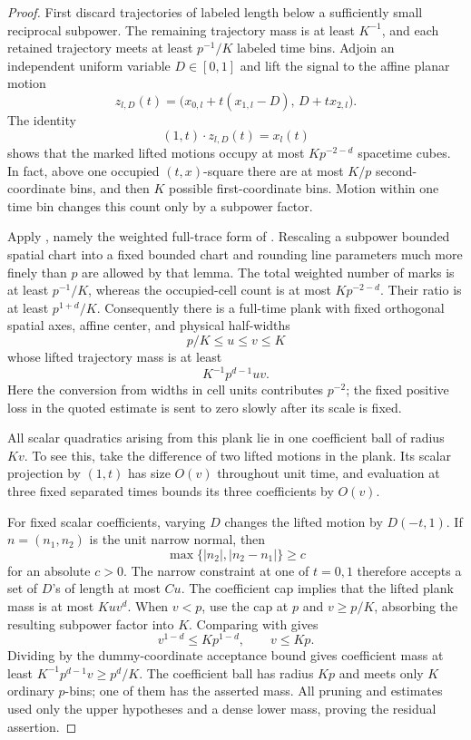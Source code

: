 \begin{proof}
First discard trajectories of labeled length below a sufficiently small
reciprocal subpower.  The remaining trajectory mass is at least \(K^{-1}\),
and each retained trajectory meets at least \(p^{-1}/K\) labeled time
bins.  Adjoin an independent uniform variable \(D\in[0,1]\) and lift the
signal to the affine planar motion
\begin{equation}\label{a04:quadratic-lift}
 z_{l,D}(t)=\bigl(x_{0,l}+t(x_{1,l}-D),\,D+t x_{2,l}\bigr).
\end{equation}
The identity
\[
 (1,t)\cdot z_{l,D}(t)=x_l(t)
\]
shows that the marked lifted motions occupy at most \(Kp^{-2-d}\)
spacetime cubes.  In fact, above one occupied \((t,x)\)-square there
are at most \(K/p\) second-coordinate bins, and then \(K\) possible
first-coordinate bins.  Motion within one time bin changes this count
only by a subpower factor.

Apply , namely the weighted full-trace form of
\citet[Lemma~2.3]{ThreeDimensional}.  Rescaling a subpower bounded spatial
chart into a fixed bounded chart and rounding line parameters much more
finely than \(p\) are allowed by that lemma.  The total weighted number
of marks is at least \(p^{-1}/K\), whereas the occupied-cell count is at
most \(Kp^{-2-d}\).  Their ratio is at least \(p^{1+d}/K\).
Consequently there is a full-time plank with fixed orthogonal spatial
axes, affine center, and physical half-widths
\[
 p/K\le u\le v\le K
\]
whose lifted trajectory mass is at least
\begin{equation}\label{a04:plank-lower}
 K^{-1}p^{d-1}uv.
\end{equation}
Here the conversion from widths in cell units contributes \(p^{-2}\);
the fixed positive loss in the quoted estimate is sent to zero slowly
after its scale is fixed.

All scalar quadratics arising from this plank lie in one coefficient
ball of radius \(Kv\).  To see this, take the difference of two lifted
motions in the plank.  Its scalar projection by \((1,t)\) has size
\(O(v)\) throughout unit time, and evaluation at three fixed separated
times bounds its three coefficients by \(O(v)\).

For fixed scalar coefficients, varying \(D\) changes the lifted motion
by \(D(-t,1)\).  If \(n=(n_1,n_2)\) is the unit narrow normal, then
\[
 \max\{|n_2|,|n_2-n_1|\}\ge c
\]
for an absolute \(c>0\).  The narrow constraint at one of \(t=0,1\)
therefore accepts a set of \(D\)'s of length at most \(Cu\).
The coefficient cap implies that the lifted plank mass is at most
\(Kuv^d\).  When \(v<p\), use the cap at \(p\) and
\(v\ge p/K\), absorbing the resulting subpower factor into \(K\).
Comparing with  gives
\[
 v^{1-d}\le Kp^{1-d},\qquad v\le Kp.
\]
Dividing  by the dummy-coordinate acceptance
bound gives coefficient mass at least
\(K^{-1}p^{d-1}v\ge p^d/K\).
The coefficient ball has radius \(Kp\) and meets only \(K\) ordinary
\(p\)-bins; one of them has the asserted mass.
All pruning and estimates used only the upper hypotheses and a dense
lower mass, proving the residual assertion.
\end{proof}

